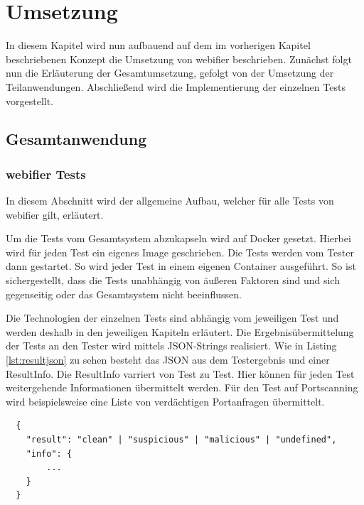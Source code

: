 \chapter{Umsetzung}

In diesem Kapitel wird nun aufbauend auf dem im vorherigen Kapitel beschriebenen Konzept die Umsetzung von webifier beschrieben. Zunächst folgt nun die Erläuterung der Gesamtumsetzung, gefolgt von der Umsetzung der Teilanwendungen. Abschließend wird die Implementierung der einzelnen Tests vorgestellt.

\section{Gesamtanwendung}


\subsection{webifier Tests}
In diesem Abschnitt wird der allgemeine Aufbau, welcher für alle Tests von webifier gilt, erläutert.

Um die Tests vom Gesamtsystem abzukapseln wird auf Docker gesetzt. Hierbei wird für jeden Test ein eigenes Image geschrieben. Die Tests werden vom Tester dann gestartet. So wird jeder Test in einem eigenen Container ausgeführt. So ist sichergestellt, dass die Tests unabhängig von äußeren Faktoren sind und sich gegenseitig oder das Gesamtsystem nicht beeinflussen.

Die Technologien der einzelnen Tests sind abhängig vom jeweiligen Test und werden deshalb in den
jeweiligen Kapiteln erläutert. Die Ergebnisübermittelung der Tests an den Tester wird mittels
\ac{JSON}-Strings realisiert. Wie in Listing \ref{lst:resultjson} zu sehen besteht das \ac{JSON} aus dem
Testergebnis und einer ResultInfo. Die ResultInfo varriert von Test zu Test. Hier können für jeden Test weitergehende Informationen übermittelt werden. Für den Test auf Portscanning wird beispielsweise eine Liste von verdächtigen Portanfragen übermittelt.

\begin{scriptsize}
\begin{lstlisting}
  {
  	"result": "clean" | "suspicious" | "malicious" | "undefined",
  	"info": {
  		...
  	}
  }
\end{lstlisting}
\end{scriptsize}

